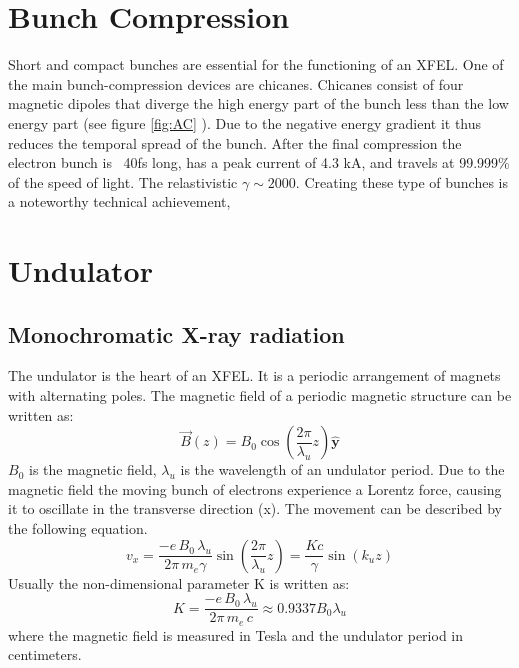 \section{Bunch Compression}
Short and compact bunches are essential for the functioning of an XFEL. One of the main bunch-compression devices are chicanes. Chicanes consist of four magnetic dipoles that diverge the high energy part of the bunch less than the low energy part (see figure \ref{fig:AC} ). Due to the negative energy gradient it thus reduces the temporal spread of the bunch. After the final compression the electron bunch is ~40fs long, has a peak current of 4.3 kA, and travels at 99.999\% of the speed of light. The relastivistic $\gamma \sim 2000$. Creating these type of bunches is a noteworthy technical achievement, 

\section{Undulator}
\subsection{Monochromatic X-ray radiation}
The undulator is the heart of an XFEL. It is a periodic arrangement of magnets with alternating poles. The magnetic field of a periodic magnetic structure can be written as:
\begin{equation}\vec{B}(z) = B_0\cos{(\frac{2\pi}{\lambda_u}z)}\hat{\mathbf{y}}\label{eq:bz}\end{equation}
$B_0$ is the magnetic field, $\lambda_u$ is the wavelength of an undulator period.
Due to the magnetic field the moving bunch of electrons experience a Lorentz force, causing it to oscillate in the transverse direction (x). The movement can be described by the following equation. 
\begin{equation}v_x = \frac{-e\,B_0\,\lambda_u}{2\pi\,m_e\gamma} \sin{(\frac{2\pi}{\lambda_u}z)} = \frac{K c}{\gamma} \sin{(k_uz)}\label{eq:vx}\end{equation}
Usually the non-dimensional parameter K is written as:
\[K =  \frac{-e\,B_0\,\lambda_u}{2\pi\,m_e \, c}  \approx 0.9337 B_0 \lambda_u\]
where the magnetic field is measured in Tesla and the undulator period in centimeters.

